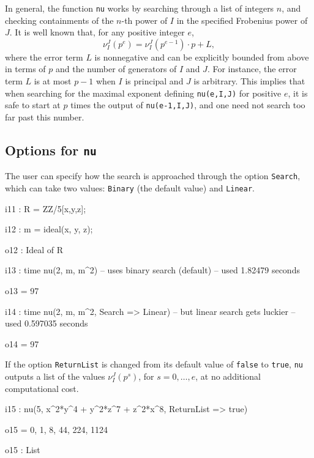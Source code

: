 \documentclass{amsart}
\begin{document}
In general, the function \texttt{nu} works by searching through a list of integers $n$, and checking containments of the $n$-th power of $I$ in the specified Frobenius power of $J$.
It is well known that, for any positive integer $e$,
\[ \nu_I^J(p^e) = \nu_I^J(p^{e-1})\cdot p + L,\]
where the error term $L$ is nonnegative and can be explicitly bounded from above in terms of $p$ and the number of generators of $I$ and $J$.
For instance, the error term $L$ is at most $p-1$ when $I$ is principal and $J$ is arbitrary.
This implies that when searching for the maximal exponent defining \texttt{nu(e,I,J)} for positive $e$, it is safe to start at $p$ times the output of \texttt{nu(e-1,I,J)}, and one need not search too far past this number.

\subsection{Options for \texttt{nu}}


The user can specify how the search is approached through the option \texttt{Search}, which can take two values: 
 \texttt{Binary} (the default value) and \texttt{Linear}.

\smallskip
{\small
{}
\begin{MyVerbatim}
i11 : R = ZZ/5[x,y,z];

i12 : m = ideal(x, y, z);

o12 : Ideal of R

i13 : time nu(2, m, m^2) -- uses binary search (default)
     -- used 1.82479 seconds

o13 = 97

i14 : time nu(2, m, m^2, Search => Linear) -- but linear search gets luckier
     -- used 0.597035 seconds

o14 = 97
\end{MyVerbatim}
}
\smallskip




If the option \texttt{ReturnList} is changed from its default value of \texttt{false} to \texttt{true}, \texttt{nu} outputs a list of the values $\nu_I^J(p^s)$, for $s=0,\ldots,e$, at no additional computational cost.

\smallskip
{\small
{}
\begin{MyVerbatim}
i15 : nu(5, x^2*y^4 + y^2*z^7 + z^2*x^8, ReturnList => true)

o15 = {0, 1, 8, 44, 224, 1124}

o15 : List
\end{MyVerbatim}
}
\smallskip
\end{document}
